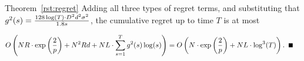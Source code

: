 \begin{emptyextraproof}{Theorem~\ref{rst:regret}}
Adding all three types of regret terms,
and substituting that 
$g^2(s) = \frac{128\log(T) \cdot D^2 d^2 \sigma^2}{1.8 s}$,
the cumulative regret up to time $T$ is at most

\begin{align*}
O \left(\ARMNUM \MAXR \cdot \exp \left( \frac{2}{p} \right)
+ \ARMNUM^2 \MAXR d
+ \ARMNUM \TieDensity \cdot \sum_{s=1}^{T} g^2(s) \log(s) \right)
& = 
O \left(\ARMNUM  \cdot \exp \left( \frac{2}{p} \right)
+ \ARMNUM \TieDensity \cdot \log^3(T) \right).\QED
\end{align*}
\end{emptyextraproof}
